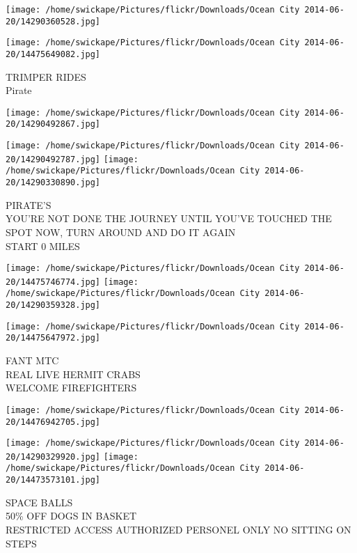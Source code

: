 \documentclass[10pt,letterpaper]{article}
\begin{document}
\texttt{[image: /home/swickape/Pictures/flickr/Downloads/Ocean City 2014-06-20/14290360528.jpg]}

\vspace{0.25in}
\texttt{[image: /home/swickape/Pictures/flickr/Downloads/Ocean City 2014-06-20/14475649082.jpg]}

TRIMPER RIDES\\
Pirate\\
\pagebreak

\texttt{[image: /home/swickape/Pictures/flickr/Downloads/Ocean City 2014-06-20/14290492867.jpg]}

\vspace{0.25in}
\texttt{[image: /home/swickape/Pictures/flickr/Downloads/Ocean City 2014-06-20/14290492787.jpg]}
\texttt{[image: /home/swickape/Pictures/flickr/Downloads/Ocean City 2014-06-20/14290330890.jpg]}

PIRATE'S\\
YOU'RE NOT DONE THE JOURNEY UNTIL YOU'VE TOUCHED THE SPOT NOW, TURN AROUND AND DO IT AGAIN\\
START 0 MILES\\
\pagebreak

\texttt{[image: /home/swickape/Pictures/flickr/Downloads/Ocean City 2014-06-20/14475746774.jpg]}
\texttt{[image: /home/swickape/Pictures/flickr/Downloads/Ocean City 2014-06-20/14290359328.jpg]}

\texttt{[image: /home/swickape/Pictures/flickr/Downloads/Ocean City 2014-06-20/14475647972.jpg]}

FANT MTC\\
REAL LIVE HERMIT CRABS\\
WELCOME FIREFIGHTERS\\
\pagebreak

\texttt{[image: /home/swickape/Pictures/flickr/Downloads/Ocean City 2014-06-20/14476942705.jpg]}

\vspace{0.25in}
\texttt{[image: /home/swickape/Pictures/flickr/Downloads/Ocean City 2014-06-20/14290329920.jpg]}
\texttt{[image: /home/swickape/Pictures/flickr/Downloads/Ocean City 2014-06-20/14473573101.jpg]}

SPACE BALLS\\
50\% OFF DOGS IN BASKET\\
RESTRICTED ACCESS AUTHORIZED PERSONEL ONLY NO SITTING ON STEPS\\
\pagebreak
\end{document}
